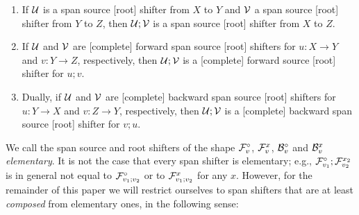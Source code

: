 \begin{fullorname} 
\begin{proposition}
\begin{enumerate}[topsep=\smallskipamount]
\item If $\cU$ is a span source [root] shifter from $X$ to $Y$ and $\cV$ a span source [root] shifter from $Y$ to $Z$, then $\cU;\cV$ is a span source [root] shifter from $X$ to $Z$. 
\item If $\cU$ and $\cV$ are [complete] forward span source [root] shifters for $u: X\to Y$ and $v: Y \to Z$, respectively, then $\cU;\cV$ is a [complete] forward source [root] shifter for $u;v$.
\item Dually, if $\cU$ and $\cV$ are [complete] backward span source [root] shifters for $u: Y\to X$ and $v: Z \to Y$, respectively, then $\cU;\cV$ is a [complete] backward span source [root] shifter for $v;u$.
\end{enumerate}
\end{proposition}
\end{fullorname}
%

%
We call the span source and root shifters of the shape $\dF v$, $\rF v x$, $\dB v$ and $\rB v x$ \emph{elementary}. It is not the case that every span shifter is elementary; e.g., $\dF{v_1};\rF{v_2}{x_2}$ is in general not equal to $\dF{v_1;v_2}$ or to $\rF{v_1;v_2} x$ for any $x$. However, for the remainder of this paper we will restrict ourselves to span shifters that are at least \emph{composed} from elementary ones, in the following sense:

